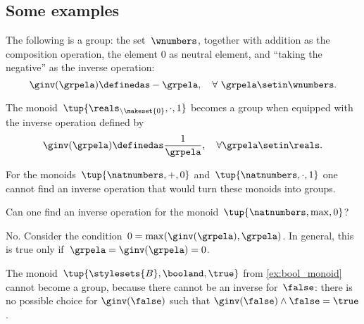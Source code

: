 \subsection{Some examples}

\begin{example}
    The following is a group: the set~$\wnumbers$, together with addition as the composition operation, the element $0$ as neutral element, and ``taking the negative'' as the inverse operation:
    \begin{equation}
        \ginv(\grpela) \definedas -\grpela, \quad \forall \ \grpela \setin \wnumbers.
    \end{equation}
\end{example}
\begin{example}
    The monoid~$\tup{\reals_{\backslash \makeset{0}}, \cdot, 1}$ becomes a group when equipped with the inverse operation defined by
    \begin{equation}
        \ginv(\grpela) \definedas \frac{1}{\grpela}, \quad \forall \grpela \setin \reals.
    \end{equation}
\end{example}

\begin{example}
    For the monoids~$\tup{\natnumbers, +,0}$ and~$\tup{\natnumbers,\cdot ,1}$ one cannot find an inverse operation that would turn these monoids into groups.
\end{example}

\begin{exercise}
    Can one find an inverse operation for the monoid~$\tup{\natnumbers,\max,0}$?
\end{exercise}
%
\begin{solution}
    No.
    Consider the condition~$0=\max(\ginv(\grpela),\grpela)$.
    In general, this is true only if~$\grpela=\ginv(\grpela)=0$.
\end{solution}

\begin{example}
    The monoid~$\tup{\stylesets{B},\booland, \true}$ from \cref{ex:bool_monoid} cannot become a group, because there cannot be an inverse for~$\false$: there is no possible choice for $\ginv(\false)$ such that $\ginv(\false)\wedge \false=\true$.
\end{example}

